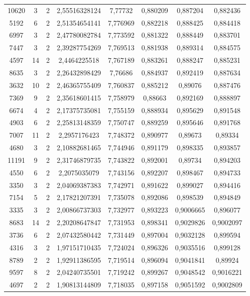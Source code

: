 \begin{longtable}{|c|c|c|c|c|c|c|c|}
10620 & 3 & 2 & 2,55516328124 & 7,77732 & 0,880209 & 0,887204 & 0,882436 \\
5192 & 6 & 2 & 2,51354654141 & 7,776969 & 0,882218 & 0,888425 & 0,884418 \\
6997 & 3 & 2 & 2,47780082784 & 7,773592 & 0,881322 & 0,888449 & 0,883701 \\
7447 & 3 & 2 & 2,39287754269 & 7,769513 & 0,881938 & 0,889314 & 0,884575 \\
4597 & 14 & 2 & 2,4464225518 & 7,767189 & 0,883261 & 0,888247 & 0,885231 \\
8635 & 3 & 2 & 2,26432898429 & 7,76686 & 0,884937 & 0,892419 & 0,887634 \\
3632 & 10 & 2 & 2,46365755409 & 7,760837 & 0,885212 & 0,89076 & 0,887476 \\
7369 & 9 & 2 & 2,35618601415 & 7,758979 & 0,88663 & 0,892169 & 0,888897 \\
6674 & 4 & 2 & 2,17375735081 & 7,755159 & 0,888934 & 0,895629 & 0,891548 \\
4903 & 6 & 2 & 2,25813148359 & 7,750747 & 0,889259 & 0,895646 & 0,891768 \\
7007 & 11 & 2 & 2,2957176423 & 7,748372 & 0,890977 & 0,89673 & 0,89334 \\
4680 & 3 & 2 & 2,10882681465 & 7,744946 & 0,891179 & 0,898335 & 0,893857 \\
11191 & 9 & 2 & 2,31746879735 & 7,743822 & 0,892001 & 0,89734 & 0,894203 \\
4550 & 6 & 2 & 2,2075035079 & 7,743156 & 0,892207 & 0,898467 & 0,894733 \\
3350 & 3 & 2 & 2,04069387383 & 7,742971 & 0,891622 & 0,899027 & 0,894416 \\
7154 & 5 & 2 & 2,17821207391 & 7,735078 & 0,892086 & 0,898539 & 0,894849 \\
3335 & 3 & 2 & 2,00866737303 & 7,732977 & 0,893223 & 0,9006665 & 0,896077 \\
8683 & 14 & 2 & 2,20208647847 & 7,731953 & 0,898341 & 0,9029826 & 0,9002097 \\
3736 & 6 & 2 & 2,07432580442 & 7,731449 & 0,897004 & 0,9032128 & 0,899594 \\
4316 & 3 & 2 & 1,97151710435 & 7,724024 & 0,896326 & 0,9035516 & 0,899128 \\
8789 & 2 & 2 & 1,92911386595 & 7,719514 & 0,896094 & 0,9041841 & 0,89924 \\
9597 & 8 & 2 & 2,04240735501 & 7,719242 & 0,899267 & 0,9048542 & 0,9016221 \\
4697 & 2 & 2 & 1,90813144809 & 7,718035 & 0,897158 & 0,9051592 & 0,9002809 \\

\end{longtable}
